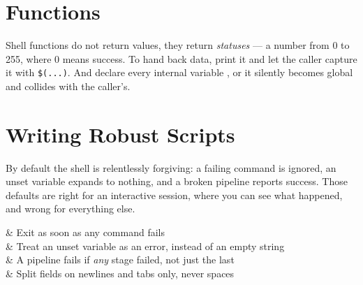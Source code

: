 \section{Functions}\label{sec:sh-func}


\begin{note}
	Shell functions do not return values, they return \emph{statuses} --- a number
	from 0 to 255, where 0 means success. To hand back data, print it and let the
	caller capture it with \texttt{\$(...)}. And declare every internal variable
	, or it silently becomes global and collides with the caller's.
\end{note}

\section{Writing Robust Scripts}\label{sec:sh-robust}

By default the shell is relentlessly forgiving: a failing command is ignored, an
unset variable expands to nothing, and a broken pipeline reports success. Those
defaults are right for an interactive session, where you can see what happened,
and wrong for everything else.


\begin{keys}[0.20]
	 & Exit as soon as any command fails                                \\
	 & Treat an unset variable as an error, instead of an empty string  \\
	 & A pipeline fails if \emph{any} stage failed, not just the last \\
	 & Split fields on newlines and tabs only, never spaces \\
\end{keys}

